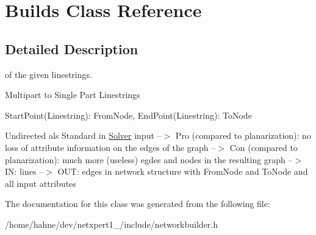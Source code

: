 \hypertarget{classBuilds}{}\section{Builds Class Reference}
\label{classBuilds}


\subsection{Detailed Description}
of the given linestrings.
\begin{DoxyItemize}
\item Multipart to Single Part Linestrings
\end{DoxyItemize}

Start\+Point(\+Linestring)\+: From\+Node, End\+Point(\+Linestring)\+: To\+Node
\begin{DoxyItemize}
\item Undirected als Standard in \hyperlink{classSolver}{Solver} input --$>$ Pro (compared to planarization)\+: no loss of attribute information on the edges of the graph --$>$ Con (compared to planarization)\+: much more (useless) egdes and nodes in the resulting graph --$>$ IN\+: lines --$>$ O\+UT\+: edges in network structure with From\+Node and To\+Node and all input attributes 
\end{DoxyItemize}

The documentation for this class was generated from the following file\+:\begin{DoxyCompactItemize}
\item 
/home/hahne/dev/netxpert1\+\_/include/networkbuilder.\+h\end{DoxyCompactItemize}
